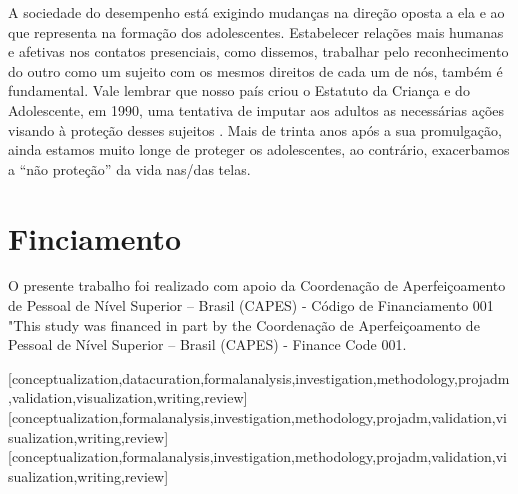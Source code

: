 \documentclass[portuguese]{textolivre}
\begin{document}
A sociedade do desempenho \cite{han_sociedade_2015} está exigindo mudanças na direção oposta a ela e ao que representa na formação dos adolescentes. Estabelecer relações mais humanas e afetivas nos contatos presenciais, como dissemos, trabalhar pelo reconhecimento do outro como um sujeito com os mesmos direitos de cada um de nós, também é fundamental. Vale lembrar que nosso país criou o Estatuto da Criança e do Adolescente, em 1990, uma tentativa de imputar aos adultos as necessárias ações visando à proteção desses sujeitos \cite{brasil_estatuto_1990}. Mais de trinta anos após a sua promulgação, ainda estamos muito longe de proteger os adolescentes, ao contrário, exacerbamos a ``não proteção'' da vida nas/das telas.


\section{Finciamento}
O presente trabalho foi realizado com apoio da Coordenação de Aperfeiçoamento de Pessoal de Nível Superior – Brasil (CAPES) - Código de Financiamento 001 "This study was financed in part by the Coordenação de Aperfeiçoamento de Pessoal de Nível Superior – Brasil (CAPES) - Finance Code 001.

\printbibliography\label{sec-bib}
\begin{contributors}
[conceptualization,datacuration,formalanalysis,investigation,methodology,projadm,validation,visualization,writing,review]
[conceptualization,formalanalysis,investigation,methodology,projadm,validation,visualization,writing,review]
[conceptualization,formalanalysis,investigation,methodology,projadm,validation,visualization,writing,review]
\end{contributors}
\end{document}
